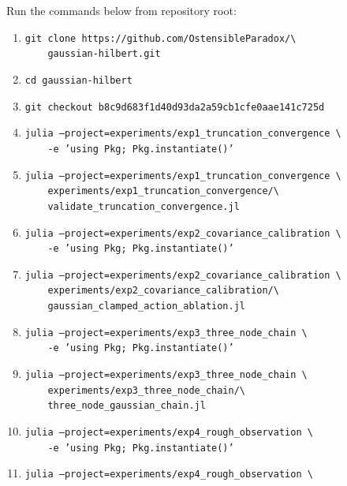 Run the commands below from repository root:
\begin{enumerate}
    \item \texttt{git clone https://github.com/OstensibleParadox/\textbackslash} \\
          \texttt{\ \ \ \ gaussian-hilbert.git}
    \item \texttt{cd gaussian-hilbert}
    \item \texttt{git checkout b8c9d683f1d40d93da2a59cb1cfe0aae141c725d}
    \item \texttt{julia --project=experiments/exp1\_truncation\_convergence \textbackslash} \\
          \texttt{\ \ \ \ -e 'using Pkg; Pkg.instantiate()'}
    \item \texttt{julia --project=experiments/exp1\_truncation\_convergence \textbackslash} \\
          \texttt{\ \ \ \ experiments/exp1\_truncation\_convergence/\textbackslash} \\
          \texttt{\ \ \ \ validate\_truncation\_convergence.jl}
    \item \texttt{julia --project=experiments/exp2\_covariance\_calibration \textbackslash} \\
          \texttt{\ \ \ \ -e 'using Pkg; Pkg.instantiate()'}
    \item \texttt{julia --project=experiments/exp2\_covariance\_calibration \textbackslash} \\
          \texttt{\ \ \ \ experiments/exp2\_covariance\_calibration/\textbackslash} \\
          \texttt{\ \ \ \ gaussian\_clamped\_action\_ablation.jl}
    \item \texttt{julia --project=experiments/exp3\_three\_node\_chain \textbackslash} \\
          \texttt{\ \ \ \ -e 'using Pkg; Pkg.instantiate()'}
    \item \texttt{julia --project=experiments/exp3\_three\_node\_chain \textbackslash} \\
          \texttt{\ \ \ \ experiments/exp3\_three\_node\_chain/\textbackslash} \\
          \texttt{\ \ \ \ three\_node\_gaussian\_chain.jl}
    \item \texttt{julia --project=experiments/exp4\_rough\_observation \textbackslash} \\
          \texttt{\ \ \ \ -e 'using Pkg; Pkg.instantiate()'}
    \item \texttt{julia --project=experiments/exp4\_rough\_observation \textbackslash} \\

\end{enumerate}
